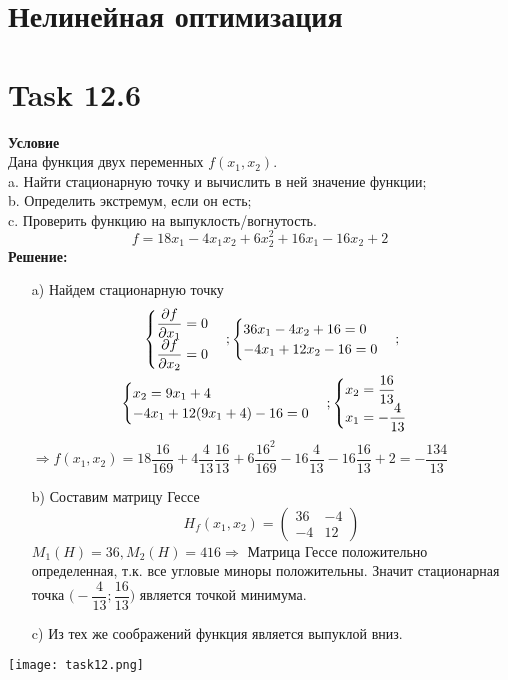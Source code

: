 \documentclass[12pt]{article}
\begin{document}
\section*{Нелинейная оптимизация}

\section*{Task 12.6}
\textbf{Условие}\\
Дана функция двух переменных $f(x_1, x_2)$.\\
a. Найти стационарную точку и вычислить в ней значение функции;\\
b. Определить экстремум, если он есть; \\
c. Проверить функцию на выпуклость/вогнутость.
\begin{equation}
  f = 18x_1-4x_1x_2+6x_2^2+16x_1-16x_2+2
\end{equation}
\textbf{Решение:}
\begin{enumerate}
  \item[a)] Найдем стационарную точку
  \begin{gather}
    \begin{cases}
        \dfrac{\partial f}{\partial x_1}=0\\
        \dfrac{\partial f}{\partial x_2}=0
    \end{cases};
    \begin{cases}
      36x_1-4x_2+16=0\\
      -4x_1+12x_2-16=0
    \end{cases};\\
    \begin{cases}
      x_2=9x_1+4\\
      -4x_1+12(9x_1+4)-16=0
    \end{cases};
    \begin{cases}
      x_2=\dfrac{16}{13}\\
      x_1=-\dfrac{4}{13}
    \end{cases}\notag
  \end{gather}
  $\Rightarrow f(x_1,x_2)=18\dfrac{16}{169}+4\dfrac{4}{13}\dfrac{16}{13}+6\dfrac{16^2}{169}-16\dfrac{4}{13}-16\dfrac{16}{13}+2=
  -\dfrac{134}{13}$
  \item[b)] Составим матрицу Гессе
  \begin{equation}
    H_f(x_1,x_2)=\begin{pmatrix}
      36&-4\\-4&12
    \end{pmatrix}
  \end{equation}
  $M_1(H)=36,M_2(H)=416\Rightarrow$ Матрица Гессе положительно определенная, т.к. все угловые миноры положительны. Значит стационарная
  точка $\big(-\dfrac{4}{13};\dfrac{16}{13}\big)$ является точкой минимума.
  \item[c)] Из тех же соображений функция является выпуклой вниз.
\end{enumerate}
\begin{center}
  \texttt{[image: task12.png]}
\end{center}
\end{document}
